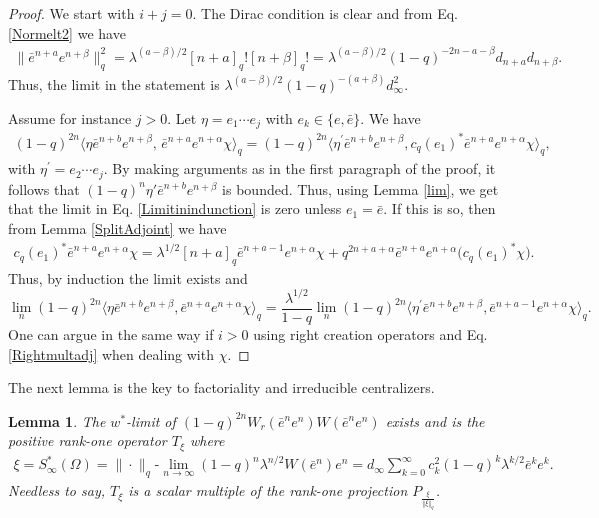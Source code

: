 \documentclass[12pt, a4paper,reqno]{amsart}
\newtheorem{Lemma}[Theorem]{Lemma}
\theoremstyle{definition}
\newcommand{\norm}[1]{\left\Vert#1\right\Vert}
\begin{document}
\begin{proof}
We start with $i+j=0$. The Dirac condition is clear and from Eq. \eqref{Normelt2} we have 
\begin{align}\label{diffuse}
\|\bar{e}^{n+a}e^{n+\beta}\|_q^2= \lambda^{(a-\beta)/2}[n+a]_q![n+\beta]_q!=
\lambda^{(a-\beta)/2} (1-q)^{-2n-a-\beta}d_{n+a}d_{n+\beta}.
\end{align}
Thus, the limit in the statement is $\lambda^{(a-\beta)/2}(1-q)^{-(a+\beta)} d_\infty^2$.

Assume for instance $j>0$.   Let $\eta=e_1\cdots e_j$ with $e_k\in\{ e, \bar{e}\} $. We have
\begin{align}\label{Limitinindunction}
(1-q)^{2n}\langle \eta \bar{e}^{n+b}e^{n+\beta},\,\bar{e}^{n+a}e^{n+\alpha}\chi\rangle_q=(1-q)^{2n}\langle \eta^\prime \bar{e}^{n+b}e^{n+\beta},c_q(e_1)^*\bar{e}^{n+a}e^{n+\alpha}\chi\rangle_q, 
\end{align}
with $\eta^\prime=e_2\cdots e_j$. By making arguments as in the first paragraph of the proof, it follows that 
$(1-q)^n\eta'\bar{e}^{n+b }e^{n+\beta}$ is bounded. Thus, using Lemma  \ref{lim}, we get that the limit in Eq. \eqref{Limitinindunction} is zero unless $e_1=\bar{e}$. If this is so, then from Lemma \ref{SplitAdjoint} we have
\begin{align*}
c_q(e_1)^*\bar{e}^{n+a}e^{n+\alpha}\chi=\lambda^{1/2}[n+a]_q \bar{e}^{n+a-1}e^{n+\alpha}\chi+ q^{2n+a+\alpha}\bar{e}^{n+a}e^{n+\alpha}\big(c_q(e_1)^*\chi\big). 
\end{align*}
Thus, by induction the limit exists and 
$$\lim_n (1-q)^{2n}\langle \eta \bar{e}^{n+b}e^{n+\beta},\bar{e}^{n+a}e^{n+\alpha}\chi\rangle_q= \frac{\lambda^{1/2}}{1-q}\lim_n(1-q)^{2n}\langle \eta^\prime \bar{e}^{n+b }e^{n+\beta},\bar{e}^{n+a-1}e^{n+\alpha}\chi
\rangle_q.$$
One can argue in the same way if $i>0$ using right creation operators and Eq. \eqref{Rightmultadj} when dealing with $\chi$. 
\end{proof}

The next lemma is the key to factoriality and irreducible centralizers. 

\begin{Lemma}\label{sxi}
The $w^*$-limit of $(1-q)^{2n}	W_r(\bar{e}^n e^n) W(\bar{e}^n e^n)$ exists and is the positive rank-one operator $T_\xi$ where 
\begin{align*} 
\xi = S_\infty^*(\Omega)=\|\cdot\|_q\text{-}\lim_{n\to \infty}(1-q)^n\lambda^{n/2} W(\bar e^n) e^n=d_\infty \sum_{k=0}^\infty c_k^2(1-q)^k \lambda^{k/2} {\bar e}^k e^k.
\end{align*}
Needless to say, $T_\xi$ is a scalar multiple of the rank-one projection $P_{\frac{\xi}{\norm{\xi}_q}}$.
\end{Lemma}
\end{document}
